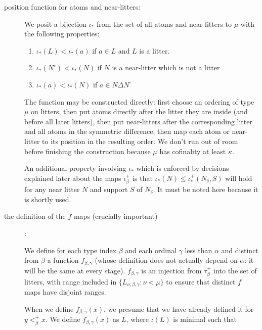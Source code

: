 \documentclass[112pt]{article}
\begin{document}
\begin{description}
\item[position function for atoms and near-litters:]  We posit a bijection $\iota_*$ from the set of all atoms and near-litters to $\mu$ with the following properties:

\begin{enumerate}

\item $\iota_*(L) < \iota_*(a)$ if $a \in L$ and $L$ is a litter.

\item  $\iota_*(N^\circ)<\iota_*(N)$ if $N$ is a near-litter which is not a litter

\item $\iota_*(a) < \iota_*(N)$ if $a \in N \Delta N^\circ$

\end{enumerate}

The function may be constructed directly: first choose an ordering of type $\mu$ on litters, then put atoms directly after the litter they are inside (and before all later litters), then put near-litters after the corresponding litter and all atoms in the symmetric difference, then map each atom or near-litter to its position in the resulting order.
We don't run out of room before finishing the construction because \( \mu \) has cofinality at least \( \kappa \).

An additional property involving $\iota_*$ which is enforced by decisions explained later about the maps $\iota_\beta^+$ is that $\iota_*(N) \leq \iota_*^+(N_\delta,S)$ will hold for any near litter $N$ and support $S$ of $N_\delta$.  It must be noted here because it is shortly used.


\item [the definition of the $f$ maps (crucially important)] :

We define for each type index $\beta$ and each ordinal $\gamma$ less than $\alpha$ and distinct from $\beta$ a function $f_{\beta,\gamma}$ (whose definition does not actually depend on $\alpha$:  it will be the same at every stage).  $f_{\beta,\gamma}$ is an injection from $\tau_\beta^+$ into the set of litters, with range included in \newline $\{L_{\nu,\beta,\gamma}:\nu < \mu\}$ to ensure that distinct $f$ maps have disjoint ranges.


 When we define $f_{\beta,\gamma}(x)$, we presume that we have already defined it for $y <^+_\beta x$.
We define $f_{\beta,\gamma}(x)$ as $L$, where $\iota(L)$ is minimal such that 


\end{description}
\end{document}
